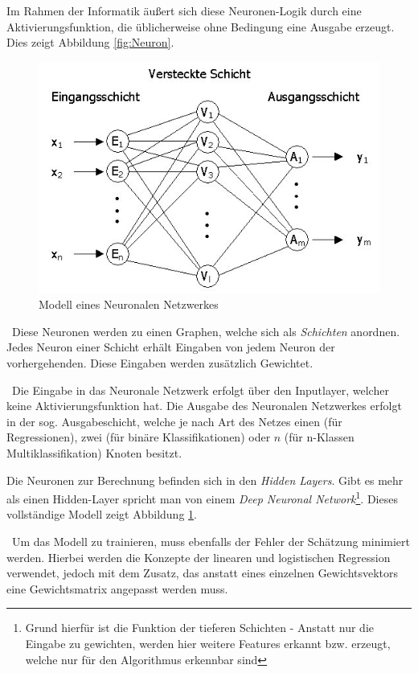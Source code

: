 Im Rahmen der Informatik äußert sich diese Neuronen-Logik durch eine Aktivierungsfunktion, die üblicherweise ohne Bedingung eine Ausgabe erzeugt. Dies zeigt Abbildung \ref{fig:Neuron}.
\begin{figure}[h]
\begin{center}
	\includegraphics[width=0.9\linewidth]{Bilder/petry19}
	\caption[Modell eines Neuronalen Netzwerkes: \url{
		http://www.jurpc.de/jurpc/show?id=19990187}]{Modell eines Neuronalen Netzwerkes}
	\label{fig:NN-Modell}
\end{center}
\end{figure}
~\newline Diese Neuronen werden zu einen Graphen, welche sich als \textit{Schichten} anordnen. Jedes Neuron einer Schicht erhält Eingaben von jedem Neuron der vorhergehenden. Diese Eingaben werden zusätzlich Gewichtet. 

~\newline Die Eingabe in das Neuronale Netzwerk erfolgt über den Inputlayer, welcher keine Aktivierungsfunktion hat. Die Ausgabe des Neuronalen Netzwerkes erfolgt in der sog. Ausgabeschicht, welche je nach Art des Netzes einen (für Regressionen), zwei (für binäre Klassifikationen) oder $n$ (für n-Klassen Multiklassifikation) Knoten besitzt.

Die Neuronen zur Berechnung befinden sich in den \textit{Hidden Layers}. Gibt es mehr als einen Hidden-Layer spricht man von einem \textit{Deep Neuronal Network}\footnote{Grund hierfür ist die Funktion der tieferen Schichten - Anstatt nur die Eingabe zu gewichten, werden hier weitere Features erkannt bzw. erzeugt, welche nur für den Algorithmus erkennbar sind}. Dieses vollständige Modell zeigt Abbildung \ref{fig:NN-Modell}.

~\newline Um das Modell zu trainieren, muss ebenfalls der Fehler der Schätzung minimiert werden. Hierbei werden die Konzepte der linearen und logistischen Regression verwendet, jedoch mit dem Zusatz, das anstatt eines einzelnen Gewichtsvektors eine Gewichtsmatrix angepasst werden muss. 
